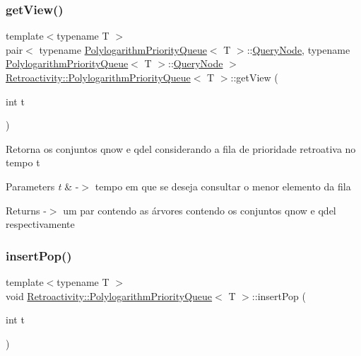 \subsubsection{\texorpdfstring{get\+View()}{getView()}}
{\footnotesize\ttfamily template$<$typename T $>$ \\
pair$<$ typename \hyperlink{classRetroactivity_1_1PolylogarithmPriorityQueue}{Polylogarithm\+Priority\+Queue}$<$ T $>$\+::\hyperlink{classRetroactivity_1_1PolylogarithmPriorityQueue_1_1QueryNode}{Query\+Node}, typename \hyperlink{classRetroactivity_1_1PolylogarithmPriorityQueue}{Polylogarithm\+Priority\+Queue}$<$ T $>$\+::\hyperlink{classRetroactivity_1_1PolylogarithmPriorityQueue_1_1QueryNode}{Query\+Node} $>$ \hyperlink{classRetroactivity_1_1PolylogarithmPriorityQueue}{Retroactivity\+::\+Polylogarithm\+Priority\+Queue}$<$ T $>$\+::get\+View (\begin{DoxyParamCaption}\item[{int}]{t }\end{DoxyParamCaption})}

Retorna os conjuntos qnow e qdel considerando a fila de prioridade retroativa no tempo t


\begin{DoxyParams}{Parameters}
{\em t} & -\/$>$ tempo em que se deseja consultar o menor elemento da fila \\
\hline
\end{DoxyParams}
\begin{DoxyReturn}{Returns}
-\/$>$ um par contendo as árvores contendo os conjuntos qnow e qdel respectivamente 
\end{DoxyReturn}
\mbox{\label{classRetroactivity_1_1PolylogarithmPriorityQueue_a67192a84402c55ac9d1ed46b424e5bd9}} 
\subsubsection{\texorpdfstring{insert\+Pop()}{insertPop()}}
{\footnotesize\ttfamily template$<$typename T $>$ \\
void \hyperlink{classRetroactivity_1_1PolylogarithmPriorityQueue}{Retroactivity\+::\+Polylogarithm\+Priority\+Queue}$<$ T $>$\+::insert\+Pop (\begin{DoxyParamCaption}\item[{int}]{t }\end{DoxyParamCaption})}

